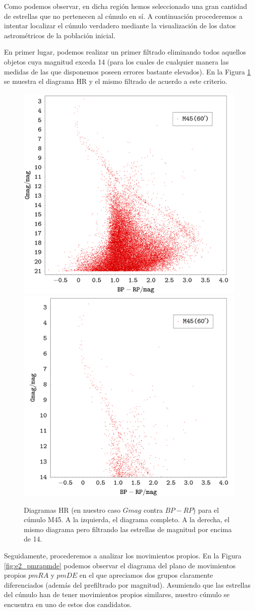 \documentclass[a4paper,fleqn,usenatbib]{mnras}
\begin{document}
Como podemos observar, en dicha región hemos seleccionado una gran cantidad de estrellas que no pertenecen al cúmulo en sí. A continuación procederemos a intentar localizar el cúmulo verdadero mediante la visualización de los datos astrométricos de la población inicial.

En primer lugar, podemos realizar un primer filtrado eliminando todos aquellos objetos cuya magnitud exceda 14 (para los cuales de cualquier manera las medidas de las que disponemos poseen errores bastante elevados). En la Figura \ref{fig:e2_bprpgmag} se muestra el diagrama HR y el mismo filtrado de acuerdo a este criterio.

\begin{figure}
  \includegraphics[width=0.49\linewidth]{img/ejercicio2_m45_bprp_gmag}
  \includegraphics[width=0.49\linewidth]{img/ejercicio2_m45_bprp_gmag_14}
  \caption{Diagramas HR (en nuestro caso $Gmag$ contra $BP-RP$) para el cúmulo M45. A la izquierda, el diagrama completo. A la derecha, el mismo diagrama pero filtrando las estrellas de magnitud por encima de 14.}
  \label{fig:e2_bprpgmag}
\end{figure}

Seguidamente, procederemos a analizar los movimientos propios. En la Figura \ref{fig:e2_pmrapmde} podemos observar el diagrama del plano de movimientos propios $pmRA$ y $pmDE$ en el que apreciamos dos grupos claramente diferenciados (además del prefiltrado por magnitud). Asumiendo que las estrellas del cúmulo han de tener movimientos propios similares, nuestro cúmulo se encuentra en uno de estos dos candidatos.
\end{document}
